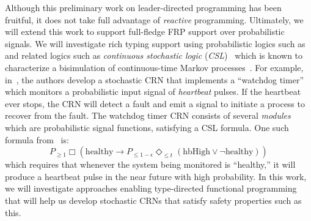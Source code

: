 Although this preliminary work on leader-directed programming has been fruitful, it does not take full advantage of \emph{reactive} programming.
Ultimately, we will extend this work to support full-fledge FRP support over probabilistic signals.
We will investigate rich typing support using probabilistic logics such as and related logics such as \emph{continuous stochastic logic} (\emph{CSL})~\cite{cASSB96} which is known to characterize a bisimulation of continuous-time Markov processes~\cite{DESHARNAIS200399}.
For example, in~\cite{jEKLLLM17}, the authors develop a stochastic CRN that implements a ``watchdog timer'' which monitors a probabilistic input signal of \emph{heartbeat} pulses.
If the heartbeat ever stops, the CRN will detect a fault and emit a signal to initiate a process to recover from the fault.
The watchdog timer CRN consists of several \emph{modules} which are probabilistic signal functions, satisfying a CSL formula.
One such formula from~\cite{jEKLLLM17} is:
\[
    P_{\ge 1}\Box\left(\text{healthy} \rightarrow P_{\le1-\epsilon}\Diamond_{\le t}(\text{hbHigh}\lor\lnot\text{healthy})\right)
\]
which requires that whenever the system being monitored is ``healthy,'' it will produce a heartbeat pulse in the near future with high probability.
In this work, we will investigate approaches enabling type-directed functional programming that will help us develop stochastic CRNs that satisfy safety properties such as this.



